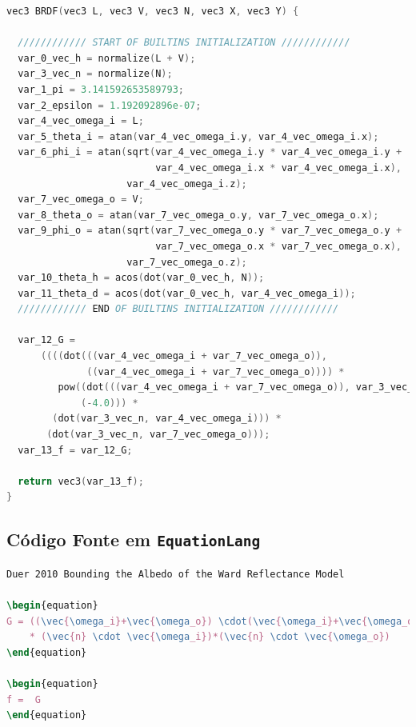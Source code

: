 \begin{codigo}[H]
    \caption{\small Saida do compilador, código GLSL da BRDF deste experimento  (parte 2). }
    \label{cod-duer-glsl-pt-2}
\begin{lstlisting}[language=C, inputencoding=utf8]
vec3 BRDF(vec3 L, vec3 V, vec3 N, vec3 X, vec3 Y) {

  //////////// START OF BUILTINS INITIALIZATION ////////////
  var_0_vec_h = normalize(L + V);
  var_3_vec_n = normalize(N);
  var_1_pi = 3.141592653589793;
  var_2_epsilon = 1.192092896e-07;
  var_4_vec_omega_i = L;
  var_5_theta_i = atan(var_4_vec_omega_i.y, var_4_vec_omega_i.x);
  var_6_phi_i = atan(sqrt(var_4_vec_omega_i.y * var_4_vec_omega_i.y +
                          var_4_vec_omega_i.x * var_4_vec_omega_i.x),
                     var_4_vec_omega_i.z);
  var_7_vec_omega_o = V;
  var_8_theta_o = atan(var_7_vec_omega_o.y, var_7_vec_omega_o.x);
  var_9_phi_o = atan(sqrt(var_7_vec_omega_o.y * var_7_vec_omega_o.y +
                          var_7_vec_omega_o.x * var_7_vec_omega_o.x),
                     var_7_vec_omega_o.z);
  var_10_theta_h = acos(dot(var_0_vec_h, N));
  var_11_theta_d = acos(dot(var_0_vec_h, var_4_vec_omega_i));
  //////////// END OF BUILTINS INITIALIZATION ////////////

  var_12_G =
      ((((dot(((var_4_vec_omega_i + var_7_vec_omega_o)),
              ((var_4_vec_omega_i + var_7_vec_omega_o)))) *
         pow((dot(((var_4_vec_omega_i + var_7_vec_omega_o)), var_3_vec_n)),
             (-4.0))) *
        (dot(var_3_vec_n, var_4_vec_omega_i))) *
       (dot(var_3_vec_n, var_7_vec_omega_o)));
  var_13_f = var_12_G;

  return vec3(var_13_f);
}
\end{lstlisting}
\end{codigo}

\subsection{Código Fonte em \texttt{EquationLang}}
\begin{codigo}[H]
    \caption{\small Código fonte da BRDF deste experimento.}
    \label{cod-duer-eqlang}
\begin{lstlisting}[language=tex, frame=none, inputencoding=utf8]
Duer 2010 Bounding the Albedo of the Ward Reflectance Model

\begin{equation}
G = ((\vec{\omega_i}+\vec{\omega_o}) \cdot(\vec{\omega_i}+\vec{\omega_o})) * ((\vec{\omega_i}+\vec{\omega_o}) \cdot \vec{n})^-4
    * (\vec{n} \cdot \vec{\omega_i})*(\vec{n} \cdot \vec{\omega_o})
\end{equation}

\begin{equation}
f =  G
\end{equation}
\end{lstlisting}
\end{codigo}
